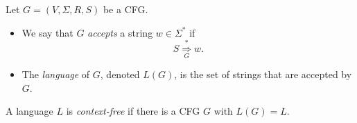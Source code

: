 \begin{definition}
  Let $G = (V, \Sigma, R, S)$ be a CFG.
  \begin{itemize}
    \item We say that $G$ \emph{accepts} a string $w \in \Sigma^*$ if
    \begin{equation*}
      S \mathrel{\mathop\Rightarrow\limits_G^*} w.
    \end{equation*}
    \item The \emph{language} of $G$, denoted $L(G)$, is the set of strings
    that are accepted by $G$.
  \end{itemize}
\end{definition}

\begin{definition}
  A language $L$ is \emph{context-free} if there is a CFG $G$ with $L(G) = L$.
\end{definition}